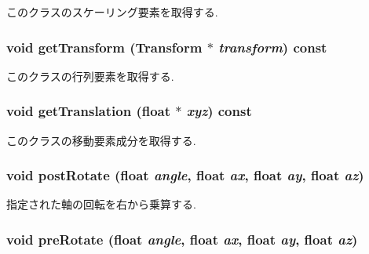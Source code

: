 このクラスのスケーリング要素を取得する. \hypertarget{classm3g_1_1Transformable_73f387f99c527b382c8aaa54b8af6ed6}{
\subsubsection[{getTransform}]{\setlength{\rightskip}{0pt plus 5cm}void getTransform ({\bf Transform} $\ast$ {\em transform}) const}}
\label{classm3g_1_1Transformable_73f387f99c527b382c8aaa54b8af6ed6}


このクラスの行列要素を取得する. \hypertarget{classm3g_1_1Transformable_d8aec42959fecc3d76f9539d3afa3c8d}{
\subsubsection[{getTranslation}]{\setlength{\rightskip}{0pt plus 5cm}void getTranslation (float $\ast$ {\em xyz}) const}}
\label{classm3g_1_1Transformable_d8aec42959fecc3d76f9539d3afa3c8d}


このクラスの移動要素成分を取得する. \hypertarget{classm3g_1_1Transformable_4abf135257f132cdf9580f3a3e11ea6c}{
\subsubsection[{postRotate}]{\setlength{\rightskip}{0pt plus 5cm}void postRotate (float {\em angle}, \/  float {\em ax}, \/  float {\em ay}, \/  float {\em az})}}
\label{classm3g_1_1Transformable_4abf135257f132cdf9580f3a3e11ea6c}


指定された軸の回転を右から乗算する. \hypertarget{classm3g_1_1Transformable_718b606184672eec83263ad44d5c7431}{
\subsubsection[{preRotate}]{\setlength{\rightskip}{0pt plus 5cm}void preRotate (float {\em angle}, \/  float {\em ax}, \/  float {\em ay}, \/  float {\em az})}}
\label{classm3g_1_1Transformable_718b606184672eec83263ad44d5c7431}


